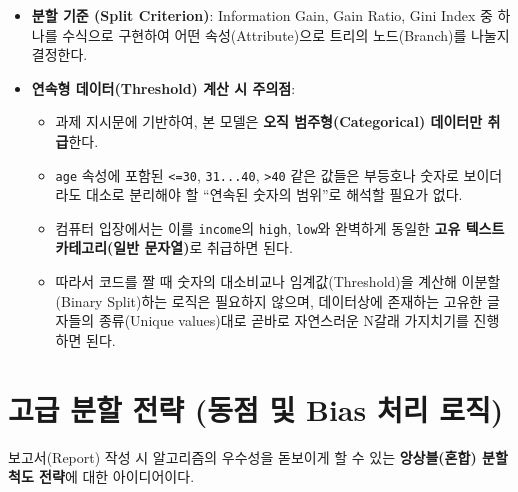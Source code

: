 \documentclass[12pt, a4paper]{article}
\begin{document}
\begin{itemize}
    \item \textbf{분할 기준 (Split Criterion)}:
    Information Gain, Gain Ratio, Gini Index 중 하나를 수식으로 구현하여 어떤 속성(Attribute)으로 트리의 노드(Branch)를 나눌지 결정한다.

    \item \textbf{연속형 데이터(Threshold) 계산 시 주의점}:
    \begin{itemize}
        \item 과제 지시문에 기반하여, 본 모델은 \textbf{오직 범주형(Categorical) 데이터만 취급}한다.
        \item \texttt{age} 속성에 포함된 \texttt{<=30}, \texttt{31...40}, \texttt{>40} 같은 값들은 부등호나 숫자로 보이더라도 대소로 분리해야 할 ``연속된 숫자의 범위''로 해석할 필요가 없다.
        \item 컴퓨터 입장에서는 이를 \texttt{income}의 \texttt{high}, \texttt{low}와 완벽하게 동일한 \textbf{고유 텍스트 카테고리(일반 문자열)}로 취급하면 된다.
        \item 따라서 코드를 짤 때 숫자의 대소비교나 임계값(Threshold)을 계산해 이분할(Binary Split)하는 로직은 필요하지 않으며, 데이터상에 존재하는 고유한 글자들의 종류(Unique values)대로 곧바로 자연스러운 N갈래 가지치기를 진행하면 된다.
    \end{itemize}
\end{itemize}


\section{고급 분할 전략 (동점 및 Bias 처리 로직)}

보고서(Report) 작성 시 알고리즘의 우수성을 돋보이게 할 수 있는 \textbf{앙상블(혼합) 분할 척도 전략}에 대한 아이디어이다.
\end{document}
